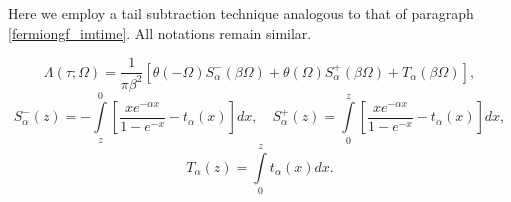 \documentclass[]{article}
\begin{document}
Here we employ a tail subtraction technique analogous to that of paragraph
\ref{fermiongf_imtime}. All notations remain similar.

\begin{equation}
	\Lambda(\tau;\Omega) = \frac{1}{\pi\beta^2} \left[
	\theta(-\Omega)S^-_\alpha(\beta\Omega) +
	\theta(\Omega)S^+_\alpha(\beta\Omega) +
	T_\alpha(\beta\Omega)
	\right],
\end{equation}
\begin{equation}
	S^-_\alpha(z) = -\int\limits_z^0
	\left[\frac{xe^{-\alpha x}}{1-e^{-x}} - t_\alpha(x)
	\right] dx,\quad
	S^+_\alpha(z) = \int\limits_0^z
	\left[\frac{xe^{-\alpha x}}{1-e^{-x}} - t_\alpha(x)
	\right] dx,
\end{equation}
\begin{equation}
	T_\alpha(z) = \int\limits_0^z t_\alpha(x) dx.
\end{equation}
\end{document}
